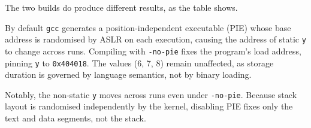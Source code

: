 
The two builds do produce different results, as the table shows.

By default \texttt{gcc} generates a position-independent executable (PIE) whose
base address is randomised by ASLR on each execution, causing the address of
static \texttt{y} to change across runs. Compiling with \texttt{-no-pie} fixes
the program's load address, pinning \texttt{y} to \texttt{0x404018}. The values
(6, 7, 8) remain unaffected, as storage duration is governed by language
semantics, not by binary loading.

Notably, the non-static \texttt{y} moves across runs even under
\texttt{-no-pie}. Because stack layout is randomised independently by the
kernel, disabling PIE fixes only the text and data segments, not the stack.
